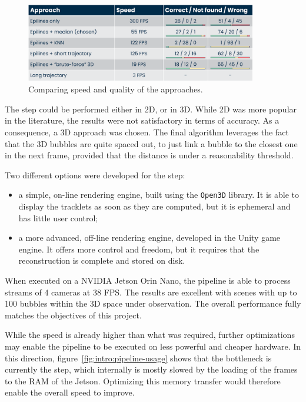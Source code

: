 \begin{figure}
	\centerline{\includegraphics[width=0.9\textwidth]{images/3d-matching-comparison.png}}
	\caption{\centering Comparing speed and quality of the \match* approaches.}
	\label{fig:intro:3dmatching-cmp}
\end{figure}


The \link* step could be performed either in 2D, or in 3D.
While 2D \link* was more popular in the literature, the results were not satisfactory in terms of accuracy.
As a consequence, a 3D \link* approach was chosen.
The final algorithm leverages the fact that the 3D bubbles are quite spaced out, to just link a bubble to the closest one in the next frame, provided that the distance is under a reasonability threshold.


Two different options were developed for the \visual* step:
\begin{itemize}
	\itemsep 0em
	\item a simple, on-line rendering engine, built using the \texttt{Open3D} library. It is able to display the tracklets as soon as they are computed, but it is ephemeral and has little user control;
	\item a more advanced, off-line rendering engine, developed in the Unity game engine. It offers more control and freedom, but it requires that the reconstruction is complete and stored on disk.
\end{itemize}


When executed on a NVIDIA Jetson Orin Nano, the pipeline is able to process streams of 4 cameras at 38 FPS.
The results are excellent with scenes with up to 100 bubbles within the 3D space under observation.
The overall performance fully matches the objectives of this project.

While the speed is already higher than what was required, further optimizations may enable the pipeline to be executed on less powerful and cheaper hardware.
In this direction, figure~\ref{fig:intro:pipeline-usage} shows that the bottleneck is currently the \locate* step, which internally is mostly slowed by the loading of the frames to the RAM of the Jetson.
Optimizing this memory transfer would therefore enable the overall speed to improve.

